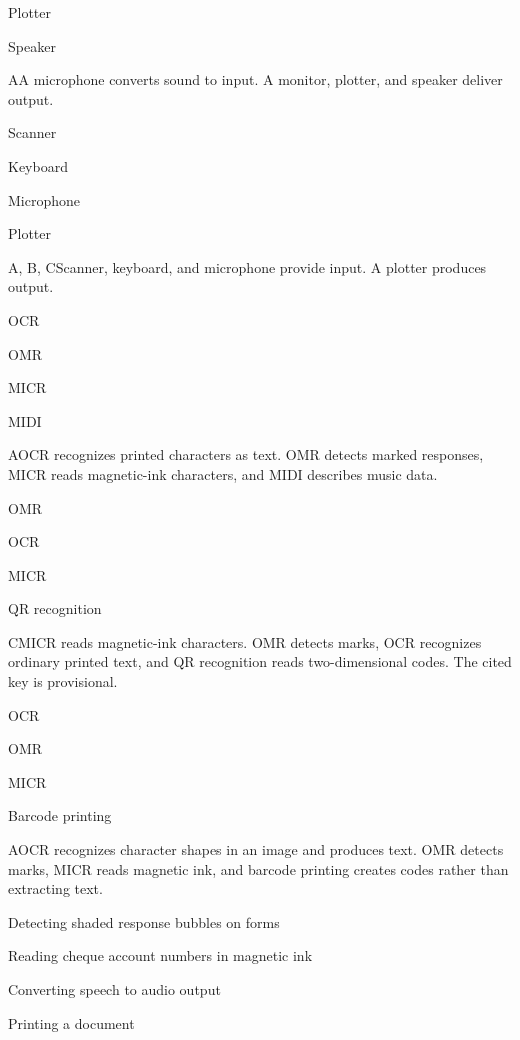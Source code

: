 \begin{enumerate}[label=\textbf{Q\arabic*.}, leftmargin=*]
{   \item Plotter
   \item Speaker}
  {A}{A microphone converts sound to input. A monitor, plotter, and speaker deliver output.}
  {\item Scanner
   \item Keyboard
   \item Microphone
   \item Plotter}
  {A, B, C}{Scanner, keyboard, and microphone provide input. A plotter produces output.}
\fi
\ifnum{}
  {\item OCR
   \item OMR
   \item MICR
   \item MIDI}
  {A}{OCR recognizes printed characters as text. OMR detects marked responses, MICR reads magnetic-ink characters, and MIDI describes music data.}
  {\item OMR
   \item OCR
   \item MICR
   \item QR recognition}
  {C}{MICR reads magnetic-ink characters. OMR detects marks, OCR recognizes ordinary printed text, and QR recognition reads two-dimensional codes. The cited key is provisional.}
  {\item OCR
   \item OMR
   \item MICR
   \item Barcode printing}
  {A}{OCR recognizes character shapes in an image and produces text. OMR detects marks, MICR reads magnetic ink, and barcode printing creates codes rather than extracting text.}
  {\item Detecting shaded response bubbles on forms
   \item Reading cheque account numbers in magnetic ink
   \item Converting speech to audio output
   \item Printing a document}

\end{enumerate}
